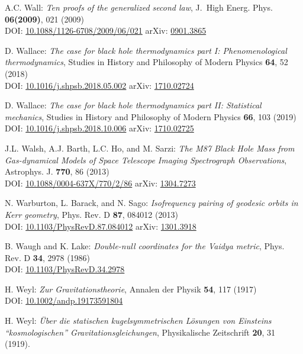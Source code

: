 \begin{thebibliography}{123}
A.C. Wall:
{\em Ten proofs of the generalized second law},
J.~High Energ. Phys. {\bf 06(2009)}, 021 (2009)\\
DOI: \href{https://doi.org/10.1088/1126-6708/2009/06/021}{10.1088/1126-6708/2009/06/021}\hfill
arXiv: \href{https://arxiv.org/abs/0901.3865}{0901.3865}

D. Wallace:
{\em The case for black hole thermodynamics part I: Phenomenological thermodynamics},
Studies in History and Philosophy of Modern Physics {\bf 64}, 52 (2018)\\
DOI: \href{https://doi.org/10.1016/j.shpsb.2018.05.002}{10.1016/j.shpsb.2018.05.002}\hfill
arXiv: \href{https://arxiv.org/abs/1710.02724}{1710.02724}

D. Wallace:
{\em The case for black hole thermodynamics part II: Statistical mechanics},
Studies in History and Philosophy of Modern Physics {\bf 66}, 103 (2019)\\
DOI: \href{https://doi.org/10.1016/j.shpsb.2018.10.006}{10.1016/j.shpsb.2018.10.006}\hfill
arXiv: \href{https://arxiv.org/abs/1710.02725}{1710.02725}

J.L. Walsh, A.J. Barth, L.C. Ho, and M. Sarzi:
{\em The M87 Black Hole Mass from Gas-dynamical Models of Space Telescope Imaging Spectrograph Observations},
Astrophys. J. {\bf 770}, 86 (2013)\\
DOI: \href{https://doi.org/10.1088/0004-637X/770/2/86}{10.1088/0004-637X/770/2/86}\hfill
arXiv: \href{https://arxiv.org/abs/1304.7273}{1304.7273}

N. Warburton, L. Barack, and N. Sago:
{\em Isofrequency pairing of geodesic orbits in Kerr geometry},
Phys. Rev. D {\bf 87}, 084012 (2013)\\
DOI: \href{https://doi.org/10.1103/PhysRevD.87.084012}{10.1103/PhysRevD.87.084012}\hfill
arXiv: \href{https://arxiv.org/abs/1301.3918}{1301.3918}

B. Waugh and K. Lake:
{\em Double-null coordinates for the Vaidya metric},
Phys. Rev. D {\bf 34}, 2978 (1986)\\
DOI: \href{https://doi.org/10.1103/PhysRevD.34.2978}{10.1103/PhysRevD.34.2978}

H. Weyl:
{\em Zur Gravitationstheorie},
Annalen der Physik {\bf 54}, 117 (1917)\\
DOI: \href{https://doi.org/10.1002/andp.19173591804}{10.1002/andp.19173591804}

H. Weyl:
{\em \"Uber die statischen kugelsymmetrischen L\"osungen von Einsteins ``kosmologischen'' Gravitationsgleichungen},
Physikalische Zeitschrift {\bf 20}, 31 (1919).


\end{thebibliography}

